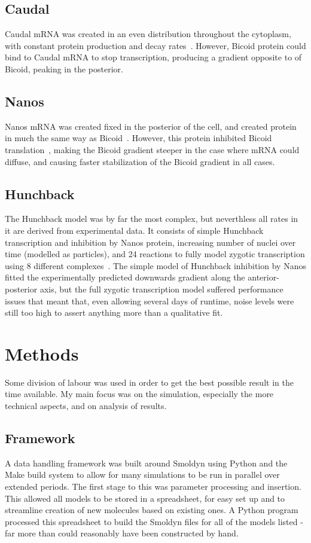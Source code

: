 \documentclass[11pt,a4paper,twocolumn]{article}
\begin{document}
\subsection{Caudal}
Caudal mRNA was created in an even distribution throughout the cytoplasm, with constant protein production and decay rates~\cite{Bergmann2007}. However, Bicoid protein could bind to Caudal mRNA to stop transcription, producing a gradient opposite to of Bicoid, peaking in the posterior.

\subsection{Nanos}
Nanos mRNA was created fixed in the posterior of the cell, and created protein in much the same way as Bicoid~\cite{Kugler2009,Bergmann2007}. However, this protein inhibited Bicoid translation~\cite{Little2011}, making the Bicoid gradient steeper in the case where mRNA could diffuse, and causing faster stabilization of the Bicoid gradient in all cases.

\subsection{Hunchback}
The Hunchback model was by far the most complex, but neverthless all rates in it are derived from experimental data. It consists of simple Hunchback transcription and inhibition by Nanos protein, increasing number of nuclei over time (modelled as particles), and 24 reactions to fully model zygotic transcription using 8 different complexes~\cite{Holloway2011}. The simple model of Hunchback inhibition by Nanos fitted the experimentally predicted downwards gradient along the anterior-posterior axis, but the full zygotic transcription model suffered performance issues that meant that, even allowing several days of runtime, noise levels were still too high to assert anything more than a qualitative fit.

\section{Methods}
Some division of labour was used in order to get the best possible result in the time available. My main focus was on the simulation, especially the more technical aspects, and on analysis of results.

\subsection{Framework}
A data handling framework was built around Smoldyn using Python and the Make build system to allow for many simulations to be run in parallel over extended periods. The first stage to this was parameter processing and insertion. This allowed all models to be stored in a spreadsheet, for easy set up and to streamline creation of new molecules based on existing ones. A Python program processed this spreadsheet to build the Smoldyn files for all of the models listed - far more than could reasonably have been constructed by hand. 
\end{document}
